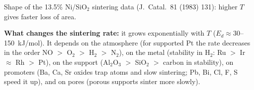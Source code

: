 \documentclass[11pt]{article}
\begin{document}
\begin{center}

{\small Shape of the 13.5\% Ni/SiO$_2$ sintering data (J.~Catal.\ 81 (1983) 131): higher $T$ gives faster loss of area.}
\end{center}

\textbf{What changes the sintering rate:} it grows exponentially with $T$ ($E_d\approx30$--150~kJ/mol). It depends on the
atmosphere (for supported Pt the rate decreases in the order NO $>$ O$_2$ $>$ H$_2$ $>$ N$_2$), on the metal (stability in H$_2$: Ru $>$ Ir $\approx$ Rh $>$ Pt),
on the support (Al$_2$O$_3$ $>$ SiO$_2$ $>$ carbon in stability), on promoters (Ba, Ca, Sr oxides trap atoms and slow sintering;
Pb, Bi, Cl, F, S speed it up), and on pores (porous supports sinter more slowly).
\end{document}
